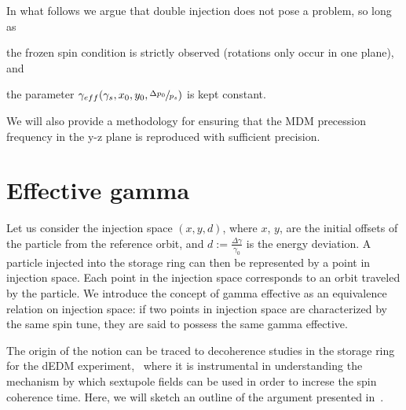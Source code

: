 \documentclass{article}
\begin{document}
In what follows we argue that double injection does not pose a problem, so long as 
\begin{inparaenum}[a)]
\item the frozen spin condition is strictly observed (rotations only occur in one plane), and
\item the parameter $\gamma_{eff}(\gamma_s, x_0, y_0, \sfrac{\Delta p_0}{p_s})$ is kept constant.
\end{inparaenum}
We will also provide a methodology for ensuring that the MDM precession frequency in the y-z plane is reproduced with sufficient precision.

\section{Effective gamma}
Let us consider the injection space $(x,y,d)$, where $x$, $y$, are the initial offsets of the particle from the reference orbit, and $d := \frac{\Delta\gamma}{\gamma_0}$ is the energy deviation. A particle injected into the storage ring can then be represented by a point in injection space. Each point in the injection space corresponds to an orbit traveled by the particle. We introduce the concept of gamma effective as an equivalence relation on injection space: if two points in injection space are characterized by the same spin tune, they are said to possess the same gamma effective. 

The origin of the notion can be traced to decoherence studies in the storage ring for the dEDM experiment,~\cite{Senichev:StorageRingMethod} where it is instrumental in understanding the mechanism by which sextupole fields can be used in order to increse the spin coherence time. Here, we will sketch an outline of the argument presented in~\cite{SenichevStorageRingMethod}.
\end{document}
